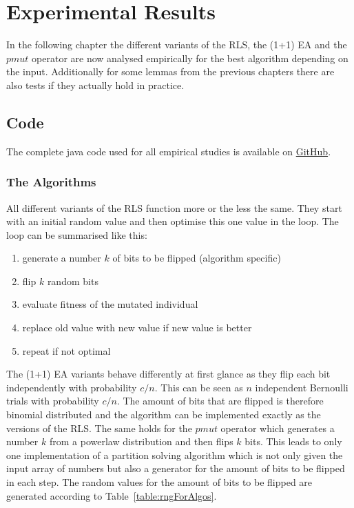 \chapter{Experimental Results}\label{ch:expRes}

In the following chapter the different variants of the RLS, the (1+1) EA and the $pmut$ operator are now analysed empirically for the best algorithm depending on the input.
Additionally for some lemmas from the previous chapters there are also tests if they actually hold in practice.

\section{Code}
The complete java code used for all empirical studies is available on \href{https://github.com/Err404NameNotFound/PartitionSolvingWithEAs}{GitHub}.
\subsection{The Algorithms}
All different variants of the RLS function more or the less the same. They start with an initial random value and then optimise this one value in the loop. The loop can be summarised like this:
\begin{enumerate}
      \item generate a number $k$ of bits to be flipped (algorithm specific)
      \item flip $k$ random bits
      \item evaluate fitness of the mutated individual
      \item replace old value with new value if new value is better
      \item repeat if not optimal
\end{enumerate}
The (1+1) EA variants behave differently at first glance as they flip each bit independently with probability $c/n$.
This can be seen as $n$ independent Bernoulli trials with probability $c/n$.
The amount of bits that are flipped is therefore binomial distributed and the algorithm can be implemented exactly as the versions of the RLS. The same holds for the $pmut$ operator which generates a number $k$ from a powerlaw distribution and then flips $k$ bits.
This leads to only one implementation of a partition solving algorithm which is not only given the input array of numbers but also a generator for the amount of bits to be flipped in each step.
The random values for the amount of bits to be flipped are generated according to Table~\ref{table:rngForAlgos}.

